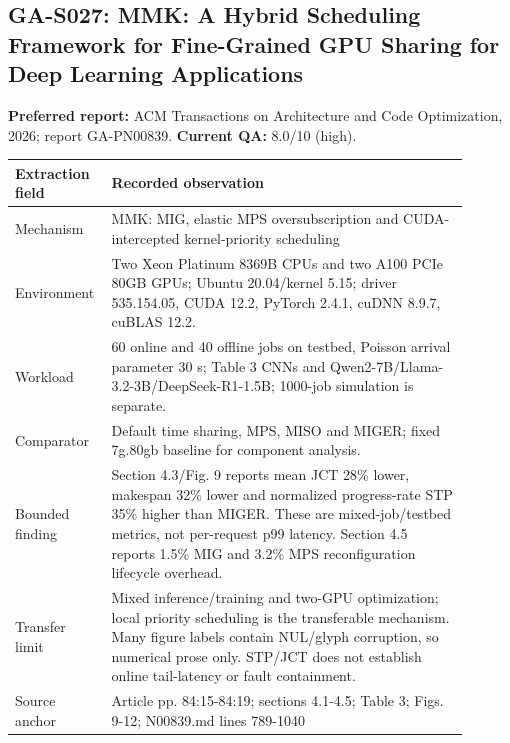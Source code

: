 \subsection{GA-S027: MMK: A Hybrid Scheduling Framework for Fine-Grained GPU Sharing for Deep Learning Applications}
\textbf{Preferred report:} ACM Transactions on Architecture and Code Optimization, 2026; report GA-PN00839. \textbf{Current QA:} 8.0/10 (high).
\begin{longtable}{P{0.15\linewidth}P{0.75\linewidth}}
\toprule Extraction field & Recorded observation\\\midrule\endhead
Mechanism & MMK: MIG, elastic MPS oversubscription and CUDA-intercepted kernel-priority scheduling\\
Environment & Two Xeon Platinum 8369B CPUs and two A100 PCIe 80GB GPUs; Ubuntu 20.04/kernel 5.15; driver 535.154.05, CUDA 12.2, PyTorch 2.4.1, cuDNN 8.9.7, cuBLAS 12.2.\\
Workload & 60 online and 40 offline jobs on testbed, Poisson arrival parameter 30 s; Table 3 CNNs and Qwen2-7B/Llama-3.2-3B/DeepSeek-R1-1.5B; 1000-job simulation is separate.\\
Comparator & Default time sharing, MPS, MISO and MIGER; fixed 7g.80gb baseline for component analysis.\\
Bounded finding & Section 4.3/Fig. 9 reports mean JCT 28\% lower, makespan 32\% lower and normalized progress-rate STP 35\% higher than MIGER. These are mixed-job/testbed metrics, not per-request p99 latency. Section 4.5 reports 1.5\% MIG and 3.2\% MPS reconfiguration lifecycle overhead.\\
Transfer limit & Mixed inference/training and two-GPU optimization; local priority scheduling is the transferable mechanism. Many figure labels contain NUL/glyph corruption, so numerical prose only. STP/JCT does not establish online tail-latency or fault containment.\\
Source anchor & Article pp. 84:15-84:19; sections 4.1-4.5; Table 3; Figs. 9-12; N00839.md lines 789-1040\\
\bottomrule\end{longtable}
